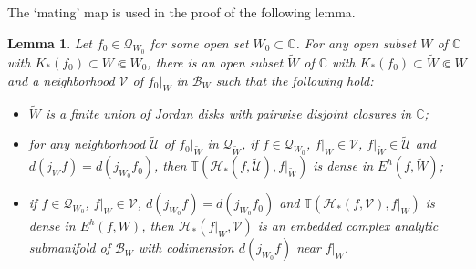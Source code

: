 \documentclass{amsart}
\numberwithin{equation}{section}
\newtheorem{lemma}[theorem]{Lemma}%
\newcommand{\C}{\mathbb C}
\theoremstyle{definition}
\theoremstyle{remark}
\begin{document}
The `mating' map is used in the proof of the following lemma. 
\begin{lemma}\label{lem:mating0}
Let $f_0\in\mathcal{Q}_{W_0}$ for some open set $W_0\subset \C$. For any open subset $W$ of $\C$ with $K_*(f_0)\subset W\Subset W_0$, there is an open subset $\widetilde{W}$ of $\C$
with $K_*(f_0)\subset \widetilde{W}\Subset W$ and a neighborhood $\mathcal{V}$ of $f_0|_W$ in $\mathcal{B}_W$ such that 
the following hold:
\begin{itemize}
\item $\widetilde{W}$ is a finite union of Jordan disks with pairwise disjoint closures in $\C$;
\item for any neighborhood $\widetilde{\mathcal{U}}$ of $f_0|_{\widetilde{W}}$ in $\mathcal{Q}_{\widetilde{W}}$, if $f\in \mathcal{Q}_{W_0}$, $f|_W\in \mathcal{V}$, $f|_{\widetilde{W}}\in \widetilde{\mathcal{U}}$ and $d(j_{W}f)=d(j_{W_0}f_0)$, then 
$\mathbb{T}(\mathcal{H}_*(f,\widetilde{\mathcal{U}}), f|_{\widetilde{W}})$ is dense in $E^h(f, \widetilde{W})$;
\item  
    if $f\in \mathcal{Q}_{W_0}$, $f|_W\in \mathcal{V}$, $d(j_{W_0}f)=d(j_{W_0}f_0)$ and $\mathbb{T}(\mathcal{H}_*(f,\mathcal{V}), f|_W)$ is dense in $E^h(f,W)$, then $\mathcal{H}_*(f|_W,\mathcal{V})$ is an embedded complex analytic submanifold of $\mathcal{B}_W$ with codimension $d(j_{W_0}f)$ near $f|_W$.
\end{itemize}
\end{lemma} 
\end{document}

